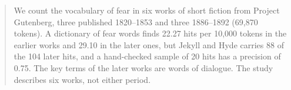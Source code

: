 \begin{abstract}
We count the vocabulary of fear in six works of short fiction from Project Gutenberg, three published 1820--1853 and three 1886--1892 (69,870 tokens). A dictionary of fear words finds 22.27 hits per 10,000 tokens in the earlier works and 29.10 in the later ones, but Jekyll and Hyde carries 88 of the 104 later hits, and a hand-checked sample of 20 hits has a precision of 0.75. The key terms of the later works are words of dialogue. The study describes six works, not either period.
\end{abstract}
